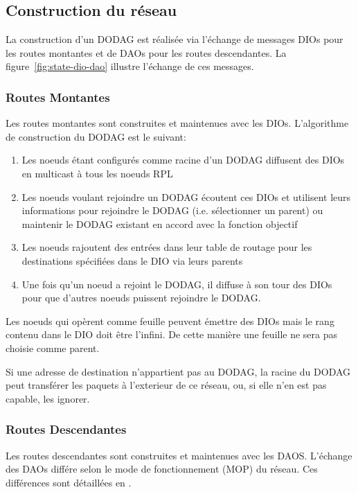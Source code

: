 \subsection*{Construction du réseau}
    La construction d'un DODAG est réalisée via l'échange de messages DIOs pour les routes montantes et de DAOs pour les routes descendantes. La figure~\ref{fig:state-dio-dao} illustre l'échange de ces messages.

\subsubsection*{Routes Montantes}
    Les routes montantes sont construites et maintenues avec les DIOs.
    L'algorithme de construction du DODAG est le suivant:
    \begin{enumerate}
        \item Les noeuds étant configurés comme racine d'un DODAG diffusent des DIOs en multicast à tous les noeuds RPL
        \item Les noeuds voulant rejoindre un DODAG écoutent ces DIOs et utilisent leurs informations pour rejoindre le DODAG (i.e. sélectionner un parent) ou maintenir le DODAG existant en accord avec la fonction objectif
        \item Les noeuds rajoutent des entrées dans leur table de routage pour les destinations spécifiées dans le DIO via leurs parents
        \item Une fois qu'un noeud a rejoint le DODAG, il diffuse à son tour des DIOs pour que d'autres noeuds puissent rejoindre le DODAG.
    \end{enumerate}

    Les noeuds qui opèrent comme feuille peuvent émettre des DIOs mais le rang contenu dans le DIO doit être l'infini. De cette manière une feuille ne sera pas choisie comme parent.

    Si une adresse de destination n'appartient pas au DODAG, la racine du DODAG peut transférer les paquets à l'exterieur de ce réseau, ou, si elle n'en est pas capable, les ignorer.     

\subsubsection*{Routes Descendantes}
    Les routes descendantes sont construites et maintenues avec les DAOS.
    L'échange des DAOs différe selon le mode de fonctionnement (MOP) du réseau. Ces différences sont détaillées en .

